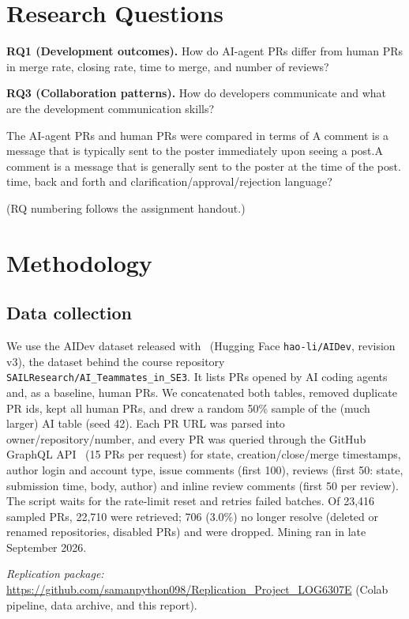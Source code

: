 \documentclass[conference]{IEEEtran}
\begin{document}
\section{Research Questions}
\textbf{RQ1 (Development outcomes).} How do AI-agent PRs differ from human PRs in merge rate, closing rate, time to merge, and number of reviews?

\textbf{RQ3 (Collaboration patterns).} How do developers communicate and what are the development communication skills?

The AI-agent PRs and human PRs were compared in terms of
A comment is a message that is typically sent to the poster immediately upon seeing a post.A comment is a message that is generally sent to the poster at the time of the post.
time, back and forth and clarification/approval/rejection language?

\noindent (RQ numbering follows the assignment handout.)

\section{Methodology}
\subsection{Data collection}
We use the AIDev dataset released with~\cite{li2025rise} (Hugging Face \texttt{hao-li/AIDev}, revision v3), the dataset behind the course repository \texttt{SAILResearch/AI\_Teammates\_in\_SE3}. It lists PRs opened by AI coding agents and, as a baseline, human PRs. We concatenated both tables, removed duplicate PR ids, kept all human PRs, and drew a random 50\% sample of the (much larger) AI table (seed 42). Each PR URL was parsed into owner/repository/number, and every PR was queried through the GitHub GraphQL API~\cite{githubgql} (15 PRs per request) for state, creation/close/merge timestamps, author login and account type, issue comments (first 100), reviews (first 50: state, submission time, body, author) and inline review comments (first 50 per review). The script waits for the rate-limit reset and retries failed batches. Of 23{,}416 sampled PRs, 22{,}710 were retrieved; 706 (3.0\%) no longer resolve (deleted or renamed repositories, disabled PRs) and were dropped. Mining ran in late September 2026.

\emph{Replication package:} \url{https://github.com/samanpython098/Replication_Project_LOG6307E} (Colab pipeline, data archive, and this report).
\end{document}
